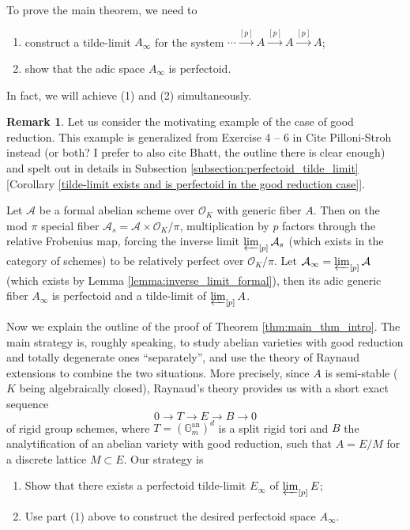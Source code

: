 \documentclass[10pt,oneside]{amsart}
\theoremstyle{definition}
\newtheorem{remark*}[mainthm]{Remark}
\begin{document}
 To prove the main theorem,  we need to 
\begin{enumerate}
\item construct a tilde-limit $A_\infty$ for the system $ \cdots \xrightarrow{[p]} A \xrightarrow{[p]} A \xrightarrow{[p]} A $;
\item show that the adic space $A_\infty$ is perfectoid. 
\end{enumerate}
In fact, we will achieve (1) and (2) simultaneously. 

\begin{remark*}	\label{remark:good_reduction}
Let us consider the motivating example of the case of good reduction. This example is generalized from Exercise 4 -- 6 in \cite{Bhatt} {\color{red} Cite Pilloni-Stroh instead (or both? I prefer to also cite Bhatt, the outline there is clear enough)} and spelt out in details in Subsection \ref{subsection:perfectoid_tilde_limit} [Corollary \ref{tilde-limit exists and is perfectoid in the good reduction case}]. 

Let $\mathcal A$ be a formal abelian scheme over $\mathcal O_K$ with generic fiber $A$. Then on the mod $\pi$ special fiber $\mathcal A_s = \mathcal A \times \mathcal O_K/\pi$,  multiplication by $p$ factors through the relative Frobenius map, forcing the inverse limit $ \varprojlim_{[p]} \mathcal A_s $ (which exists in the category of schemes) to be relatively perfect over $\mathcal O_K/\pi$. Let $\mathcal A_{\infty} = \varprojlim_{[p]} \mathcal A$ (which exists by Lemma \ref{lemma:inverse_limit_formal}), then its adic generic fiber $A_\infty$ is perfectoid and a tilde-limit of $\varprojlim_{[p]}A$.
\end{remark*}

\vspace*{0.2cm}

Now we explain the outline of the proof of Theorem \ref{thm:main_thm_intro}. The main strategy is, roughly speaking, to study abelian varieties with good reduction and totally degenerate ones ``separately'', and use the theory of Raynaud extensions to combine the two situations. More precisely, since $A$ is semi-stable ($K$ being algebraically closed), Raynaud's theory provides us with a short exact sequence 
$$ 0 \rightarrow T \rightarrow E  \rightarrow  B  \rightarrow  0 $$
of rigid group schemes, where $T = (\mathbb G_m^{\text{an}})^{d}$ is a split rigid tori and $B$ the analytification of an abelian variety with good reduction, such that $A = E/M$ for a discrete lattice $M \subset E$. Our strategy is 
\begin{enumerate}
\item Show that there exists a perfectoid tilde-limit $E_\infty$ of $\varprojlim_{[p]} E$;
\item Use part (1) above to construct the desired perfectoid space $A_\infty$.
\end{enumerate}
\end{document}
